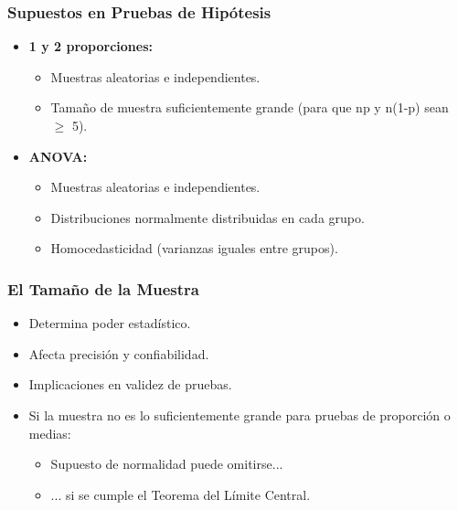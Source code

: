 \documentclass[aspectratio=169]{beamer}
\begin{document}
\begin{frame}
\frametitle{Supuestos en Pruebas de Hipótesis}
    \begin{itemize}
    \item \textbf{1 y 2 proporciones:}
    \begin{itemize}
        \item Muestras aleatorias e independientes.
        \item Tamaño de muestra suficientemente grande (para que np y n(1-p) sean $\geq$ 5).
    \end{itemize}

\vfill

    \item \textbf{ANOVA:}
    \begin{itemize}
        \item Muestras aleatorias e independientes.
        \item Distribuciones normalmente distribuidas en cada grupo.
        \item Homocedasticidad (varianzas iguales entre grupos).
    \end{itemize}
\end{itemize}

\end{frame}





\begin{frame}
\frametitle{El Tamaño de la Muestra}
\begin{itemize}
    \item Determina poder estadístico.
    \item Afecta precisión y confiabilidad.
    \item Implicaciones en validez de pruebas.
    \item Si la muestra no es lo suficientemente grande para pruebas de proporción o medias:
    \begin{itemize}
        \item Supuesto de normalidad puede omitirse...
        \item ... si se cumple el Teorema del Límite Central.
    \end{itemize}
\end{itemize}
\end{frame}
\end{document}
